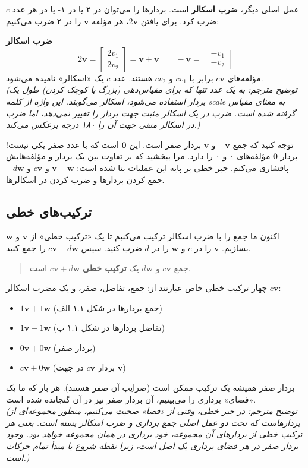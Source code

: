 \documentclass[12pt, a4paper]{book}
\begin{document}
	عمل اصلی دیگر، \textbf{ضرب اسکالر} است. بردارها را می‌توان در ۲ یا در ۱- یا در هر عدد $c$ ضرب کرد. برای یافتن $2\mathbf{v}$، هر مؤلفه $\mathbf{v}$ را در ۲ ضرب می‌کنیم:
	
	\textbf{ضرب اسکالر}
	\[ 2\mathbf{v} = \begin{bmatrix} 2v_1 \\ 2v_2 \end{bmatrix} = \mathbf{v} + \mathbf{v} \quad \quad -\mathbf{v} = \begin{bmatrix} -v_1 \\ -v_2 \end{bmatrix} \]
	مؤلفه‌های $c\mathbf{v}$ برابر با $cv_1$ و $cv_2$ هستند. عدد $c$ یک «اسکالر» نامیده می‌شود. \\
	\textit{(توضیح مترجم: به یک عدد تنها که برای مقیاس‌دهی (بزرگ یا کوچک کردن) طول یک بردار استفاده می‌شود، اسکالر می‌گویند. این واژه از کلمه scale به معنای مقیاس گرفته شده است. ضرب در یک اسکالر مثبت جهت بردار را تغییر نمی‌دهد، اما ضرب در اسکالر منفی جهت آن را ۱۸۰ درجه برعکس می‌کند.)}
	
	توجه کنید که جمع $\mathbf{-v}$ و $\mathbf{v}$ بردار صفر است. این $\mathbf{0}$ است که با عدد صفر یکی نیست! بردار $\mathbf{0}$ مؤلفه‌های ۰ و ۰ را دارد. مرا ببخشید که بر تفاوت بین یک بردار و مؤلفه‌هایش پافشاری می‌کنم. جبر خطی بر پایه این عملیات بنا شده است: $\mathbf{v} + \mathbf{w}$ و $c\mathbf{v}$ و $d\mathbf{w}$ -- جمع کردن بردارها و ضرب کردن در اسکالرها.
	
	\subsection{ترکیب‌های خطی}
	اکنون ما جمع را با ضرب اسکالر ترکیب می‌کنیم تا یک «ترکیب خطی» از $\mathbf{v}$ و $\mathbf{w}$ بسازیم. $\mathbf{v}$ را در $c$ و $\mathbf{w}$ را در $d$ ضرب کنید. سپس $c\mathbf{v} + d\mathbf{w}$ را جمع کنید.
	\begin{quote}
		جمع $c\mathbf{v}$ و $d\mathbf{w}$ یک \textbf{ترکیب خطی} $c\mathbf{v} + d\mathbf{w}$ است.
	\end{quote}
	چهار ترکیب خطی خاص عبارتند از: جمع، تفاضل، صفر، و یک مضرب اسکالر $c\mathbf{v}$:
	\begin{itemize}
		\item $1\mathbf{v} + 1\mathbf{w}$ (جمع بردارها در شکل ۱.۱ الف)
		\item $1\mathbf{v} - 1\mathbf{w}$ (تفاضل بردارها در شکل ۱.۱ ب)
		\item $0\mathbf{v} + 0\mathbf{w}$ (بردار صفر)
		\item $c\mathbf{v} + 0\mathbf{w}$ (بردار $c\mathbf{v}$ در جهت $\mathbf{v}$)
	\end{itemize}
	بردار صفر همیشه یک ترکیب ممکن است (ضرایب آن صفر هستند). هر بار که ما یک «فضای» برداری را می‌بینیم، آن بردار صفر نیز در آن گنجانده شده است. \\
	\textit{(توضیح مترجم: در جبر خطی، وقتی از «فضا» صحبت می‌کنیم، منظور مجموعه‌ای از بردارهاست که تحت دو عمل اصلی جمع برداری و ضرب اسکالر بسته است. یعنی هر ترکیب خطی از بردارهای آن مجموعه، خود برداری در همان مجموعه خواهد بود. وجود بردار صفر در هر فضای برداری یک اصل است، زیرا نقطه شروع یا مبدأ تمام حرکات است.)}
	
\end{document}
